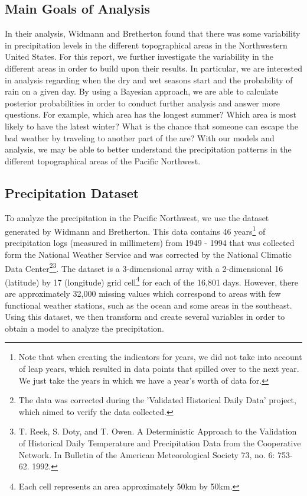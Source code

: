 \documentclass{article}
\begin{document}
\subsection{Main Goals of Analysis}
In their analysis, Widmann and Bretherton found that there was some variability in precipitation levels in the different topographical areas in the Northwestern United States. For this report, we further investigate the variability in the different areas in order to build upon their results. In particular, we are interested in analysis regarding when the dry and wet seasons start and the probability of rain on a given day. By using a Bayesian approach, we are able to calculate posterior probabilities in order to conduct further analysis and answer more questions. For example, which area has the longest summer? Which area is most likely to have the latest winter?  What is the chance that someone can escape the bad weather by traveling to another part of the are? With our models and analysis, we may be able to better understand the precipitation patterns in the different topographical areas of the Pacific Northwest. 

\subsection{Precipitation Dataset}
To analyze the precipitation in the Pacific Northwest, we use the dataset generated by Widmann and Bretherton. This data contains 46 years\footnote{Note that when creating the indicators for years, we did not take into account of leap years, which resulted in data points that spilled over to the next year. We just take the years in which we have a year's worth of data for.} of precipitation logs (measured in millimeters) from 1949 - 1994 that was collected form the National Weather Service and was corrected by the National Climatic Data Center\footnote{The data was corrected during the 'Validated Historical Daily Data' project, which aimed to verify the data collected.}\footnote{T. Reek, S. Doty, and T. Owen. A Deterministic Approach to the Validation of Historical Daily Temperature and Precipitation Data from the Cooperative Network. In Bulletin of the American Meteorological Society 73, no. 6: 753-62. 1992.}. The dataset is a 3-dimensional array with a 2-dimensional 16 (latitude) by 17 (longitude) grid cell\footnote{Each cell represents an area approximately 50km by 50km.} for each of the 16,801 days. However, there are approximately 32,000 missing values which correspond to areas with few functional weather stations, such as the ocean and some areas in the southeast. Using this dataset, we then transform and create several variables in order to obtain a model to analyze the precipitation. 
\end{document}
